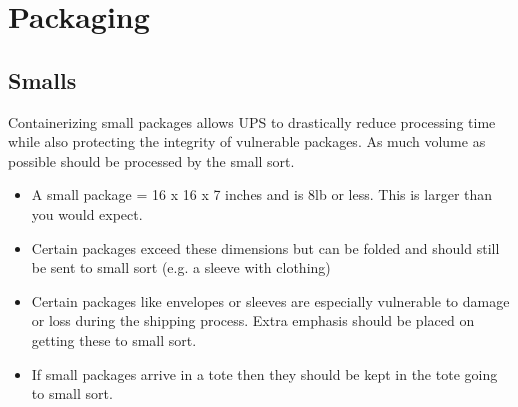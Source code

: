 \documentclass[12pt]{article}
\begin{document}
\clearpage
\section{Packaging}


\subsection{Smalls}
Containerizing small packages allows UPS to drastically reduce processing time while also protecting the integrity of vulnerable packages. As much volume as possible should be processed by the small sort. 

\begin{itemize}
    \item A small package = 16 x 16 x 7 inches and is 8lb or less. This is larger than you would expect.
    \item Certain packages exceed these dimensions but can be folded and should still be sent to small sort (e.g. a sleeve with clothing)
    \item Certain packages like envelopes or sleeves are especially vulnerable to damage or loss during the shipping process. Extra emphasis should be placed on getting these to small sort. 
    \item If small packages arrive in a tote then they should be kept in the tote going to small sort.
\end{itemize}
\end{document}
